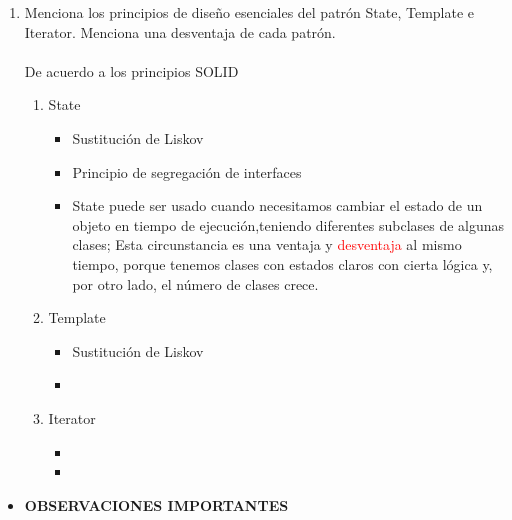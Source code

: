 \documentclass[a4paper,10pt]{article}
\begin{document}
\begin{enumerate}
    
    \item Menciona los principios de diseño esenciales del patrón State, Template e Iterator. Menciona una desventaja de cada patrón.\\\\ De acuerdo a los principios SOLID
        \begin{enumerate}
            \item \colorbox[rgb]{0.53, 0.81, 0.98}{State}
                \begin{itemize}
                    \item Sustitución de Liskov
                    \item Principio de segregación de interfaces 
                    \item State puede ser usado cuando necesitamos cambiar el estado de un objeto en tiempo de ejecución,teniendo diferentes subclases de algunas  
                    clases; Esta circunstancia es una ventaja y \textcolor{red}{desventaja} al mismo tiempo, porque tenemos clases con estados claros con cierta lógica y, por otro lado, el número de clases crece.
                   
                \end{itemize}


            
            \item \colorbox[rgb]{1.0, 0.71, 0.76}{Template}
            \begin{itemize}
                \item Sustitución de Liskov
                \item 
                 \\
                
            \end{itemize}
            

            \item \colorbox[rgb]{0.69, 0.61, 0.85}{Iterator}
            \begin{itemize}
                \item %
                \item        
            \end{itemize}    
        \end{enumerate}
\end{enumerate}

\begin{itemize}
    \item \textbf{OBSERVACIONES IMPORTANTES}
\end{itemize}
\end{document}
